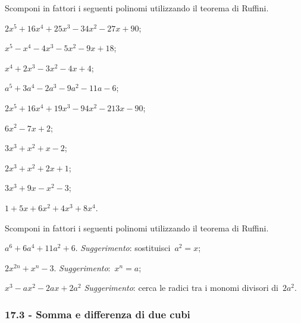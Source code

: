 \begin{esercizio}[\Ast]
\label{ese:17.14}
Scomponi in fattori i seguenti polinomi utilizzando il teorema di
Ruffini.
\begin{multicols}{2}
 \begin{enumeratea}
 \item $2x^{5}+16x^{4}+25x^{3}-34x^{2}-27x+90$;
\item $x^{5}-x^{4}-4x^{3}-5x^{2}-9x+18$;
\item $x^{4}+2x^{3}-3x^{2}-4x+4$;
\item $a^{5}+3a^{4}-2a^{3}-9a^{2}-11a-6$;
\item $2x^{5}+16x^{4}+19x^{3}-94x^{2}-213x-90$;
\item $6x^{2}-7x+2$;
\item $3x^{3}+x^{2}+x-2$;
\item $2x^{3}+x^{2}+2x+1$;
\item $3x^{3}+9x-x^{2}-3$;
\item $1+5x+6x^{2}+4x^{3}+8x^{4}$.
 \end{enumeratea}
\end{multicols}
\end{esercizio}

\begin{esercizio}[\Ast]
\label{ese:17.15}
Scomponi in fattori i seguenti polinomi utilizzando il teorema di
Ruffini.

 \begin{enumeratea}
 \item $a^{6}+6a^{4}+11a^{2}+6$. \emph{Suggerimento}: sostituisci~$a^{2}=x$;
\item $2x^{2n}+x^{n}-3$. \emph{Suggerimento}:~$x^{n}=a$;
\item $x^{3}-ax^{2}-2ax+2a^{2}$ \emph{Suggerimento}: cerca le radici tra i
monomi divisori di~$2a^{2}$.
 \end{enumeratea}
\end{esercizio}

\subsubsection*{17.3 - Somma e differenza di due cubi}

